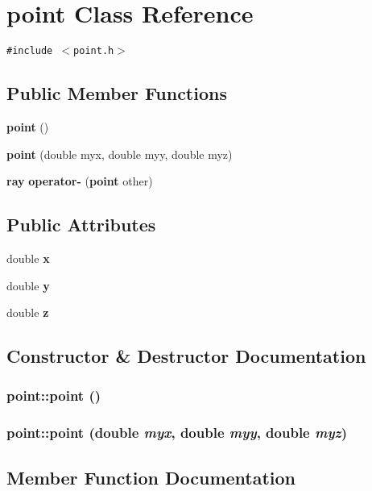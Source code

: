 \section{point Class Reference}
\label{classpoint}
{\tt \#include $<$point.h$>$}

\subsection*{Public Member Functions}
\begin{CompactItemize}
\item 
{\bf point} ()
\item 
{\bf point} (double myx, double myy, double myz)
\item 
{\bf ray} {\bf operator-} ({\bf point} other)
\end{CompactItemize}
\subsection*{Public Attributes}
\begin{CompactItemize}
\item 
double {\bf x}
\item 
double {\bf y}
\item 
double {\bf z}
\end{CompactItemize}


\subsection{Constructor \& Destructor Documentation}
\subsubsection[{point}]{\setlength{\rightskip}{0pt plus 5cm}point::point ()}\label{classpoint_5fe21d4a4539320bf0f5caf1218d31c8}


\subsubsection[{point}]{\setlength{\rightskip}{0pt plus 5cm}point::point (double {\em myx}, \/  double {\em myy}, \/  double {\em myz})}\label{classpoint_1c8b090ce06e64ed183682c2d9f68bfe}




\subsection{Member Function Documentation}
